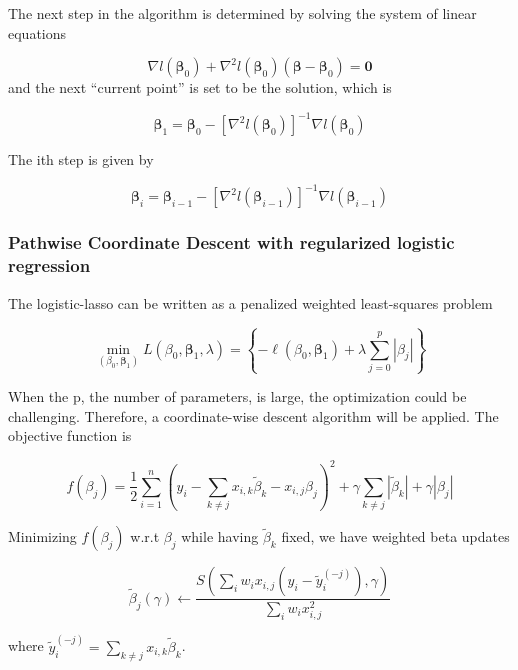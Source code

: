 \documentclass[]{article}
\begin{document}
The next step in the algorithm is determined by solving the system of
linear equations

\[
\nabla l\left(\boldsymbol{\beta}_{0}\right)+\nabla^{2} l\left(\boldsymbol{\beta}_{0}\right)\left(\boldsymbol{\beta}-\boldsymbol{\beta}_{0}\right)=\mathbf{0}
\] and the next ``current point'' is set to be the solution, which is

\[
\boldsymbol{\beta}_{1}=\boldsymbol{\beta}_{0}-\left[\nabla^{2} l\left(\boldsymbol{\beta}_{0}\right)\right]^{-1} \nabla l\left(\boldsymbol{\beta}_{0}\right)
\]

The ith step is given by

\[
\boldsymbol{\beta}_{i}=\boldsymbol{\beta}_{i-1}-\left[\nabla^{2} l\left(\boldsymbol{\beta}_{i-1}\right)\right]^{-1} \nabla l\left(\boldsymbol{\beta}_{i-1}\right)
\]

\hypertarget{pathwise-coordinate-descent-with-regularized-logistic-regression}{%
\subsubsection{Pathwise Coordinate Descent with regularized logistic
regression}\label{pathwise-coordinate-descent-with-regularized-logistic-regression}}

The logistic-lasso can be written as a penalized weighted least-squares
problem

\[
\min _{\left(\beta_{0}, \boldsymbol{\beta}_{1}\right)} L\left(\beta_{0}, \boldsymbol{\beta}_{1}, \lambda\right)=\left\{-\ell\left(\beta_{0}, \boldsymbol{\beta}_{1}\right)+\lambda \sum_{j=0}^{p}\left|\beta_{j}\right|\right\}
\]

When the p, the number of parameters, is large, the optimization could
be challenging. Therefore, a coordinate-wise descent algorithm will be
applied. The objective function is

\[
f\left(\beta_{j}\right)=\frac{1}{2} \sum_{i=1}^{n}\left(y_{i}-\sum_{k \neq j} x_{i, k} \widetilde{\beta}_{k}-x_{i, j} \beta_{j}\right)^{2}+\gamma \sum_{k \neq j}\left|\widetilde{\beta}_{k}\right|+\gamma\left|\beta_{j}\right|
\]

Minimizing \(f\left(\beta_{j}\right)\) w.r.t \(\beta_{j}\) while having
\(\widetilde{\beta}_{k}\) fixed, we have weighted beta updates

\[
\widetilde{\beta}_{j}(\gamma) \leftarrow \frac{S\left(\sum_{i} w_{i} x_{i, j}\left(y_{i}-\tilde{y}_{i}^{(-j)}\right), \gamma\right)}{\sum_{i} w_{i} x_{i, j}^{2}}
\]

where
\(\tilde{y}_{i}^{(-j)}=\sum_{k \neq j} x_{i, k} \widetilde{\beta}_{k}\).
\end{document}
